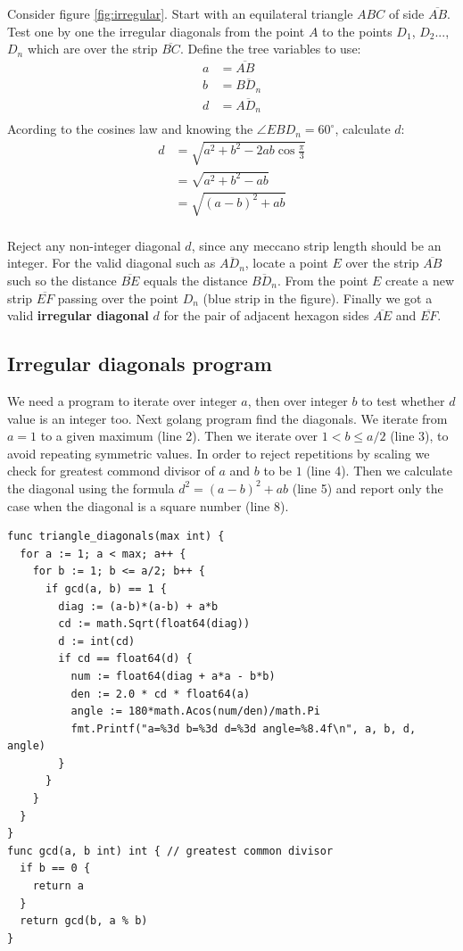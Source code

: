 \documentclass[11pt]{article}
\begin{document}
Consider figure \ref{fig:irregular}.
Start with an equilateral triangle $ABC$ of side $\overline{AB}$.
Test one by one the irregular diagonals from the point $A$ to the points $D_1$, $D_2$..., $D_n$
which are over the strip $\overline{BC}$. Define the tree variables to use:
\begin{align*}
a &= \overline{AB}\\
b &= \overline{BD_n}\\
d &= \overline{AD_n}\\
\end{align*}
Acording to the cosines law and knowing the $\angle{EBD_n} = 60^\circ{}$, calculate $d$:
\begin{align*}
d &= \sqrt{a^2 + b^2 - 2ab\cos{\frac{\pi}{3}}}\\
  &= \sqrt{a^2 + b^2 - ab}\\
  &= \sqrt{(a-b)^2 + ab}\\
\end{align*}

Reject any non-integer diagonal $d$, since any meccano strip length should be an integer.
For the valid diagonal such as $\overline{AD_n}$, locate a point $E$ over the strip $\overline{AB}$
such so the distance $\overline{BE}$ equals the distance $\overline{BD_n}$.
From the point $E$ create a new strip $\overline{EF}$ passing over the point $D_n$ (blue strip in the figure).
Finally we got a valid \textbf{irregular diagonal} $d$ for the pair of adjacent
hexagon sides $\overline{AE}$ and $\overline{EF}$.

\subsection{Irregular diagonals program}

We need a program to iterate over integer $a$, then over integer $b$ to test whether $d$ value is an integer too.
Next golang program find the diagonals.
We iterate from $a=1$ to a given maximum (line 2).
Then we iterate over $1 < b \leq a/2$ (line 3), to avoid repeating symmetric values.
In order to reject repetitions by scaling we check for greatest commond divisor
of $a$ and $b$ to be $1$ (line 4).
Then we calculate the diagonal using the formula $d^2 = (a-b)^2 + ab$ (line 5) and report
only the case when the diagonal is a square number (line 8). 
\begin{lstlisting}
func triangle_diagonals(max int) {
  for a := 1; a < max; a++ {
    for b := 1; b <= a/2; b++ {
      if gcd(a, b) == 1 {
        diag := (a-b)*(a-b) + a*b
        cd := math.Sqrt(float64(diag))
        d := int(cd)
        if cd == float64(d) {
          num := float64(diag + a*a - b*b)
          den := 2.0 * cd * float64(a)
          angle := 180*math.Acos(num/den)/math.Pi
          fmt.Printf("a=%3d b=%3d d=%3d angle=%8.4f\n", a, b, d, angle)
        }
      }
    }
  }
}
func gcd(a, b int) int { // greatest common divisor
  if b == 0 {
    return a
  }
  return gcd(b, a % b)
}
\end{lstlisting}
\end{document}
